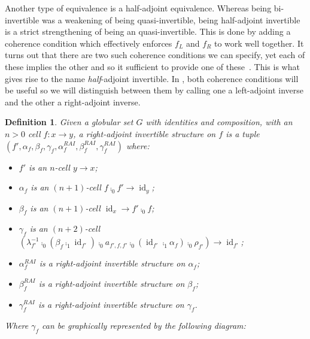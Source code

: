 \documentclass[draft]{article}
\renewcommand{\comment}[1]{\todo[color=green!40]{#1}}
\newtheorem{definition}[theorem]{Definition} \theoremstyle{remark}
\DeclareMathOperator{\id}{id}
\begin{document}
Another type of equivalence is a half-adjoint equivalence. Whereas
being bi-invertible was a weakening of being quasi-invertible, being
half-adjoint invertible is a strict strengthening of being an
quasi-invertible. This is done by adding a coherence condition which
effectively enforces \(f_L\) and \(f_R\) to work well together. It
turns out that there are two such coherence conditions we can specify,
yet each of these implies the other and so it sufficient to provide
one of these~\cite[Lemma 3.2]{nlab:adjoint_equivalence}. This
is what gives rise to the name \emph{half}-adjoint invertible. In
, both coherence conditions will be useful
so we will distinguish between them by calling one a left-adjoint
inverse and the other a right-adjoint inverse.

\begin{definition}
  Given a globular set \(G\) with identities and composition, with an
  \(n > 0\) cell \(f : x \to y\), a \emph{right-adjoint invertible}
  structure on \(f\) \comment{are these the right way round?} is a
  tuple \((f', \alpha_f, \beta_f, \gamma_f, \alpha_f^{RAI},
  \beta_f^{RAI}, \gamma_f^{RAI})\) where:
  \begin{itemize}
  \item \(f'\) is an \(n\)-cell \(y \to x\);
  \item \(\alpha_f\) is an \((n+1)\)-cell \(f \comp_0 f' \to \id_y\);
  \item \(\beta_f\) is an \((n+1)\)-cell \(\id_x \to f' \comp_0 f\);
  \item \(\gamma_f\) is an \((n+2)\)-cell \((\lambda_{f'}^{-1} \comp_0
    (\beta_f \comp_1 \id_{f'}) \comp_0 a_{f',f,f'} \comp_0 (\id_{f'}
    \comp_1 \alpha_f) \comp_0 \rho_{f'}) \to \id_{f'}\);
  \item \(\alpha_f^{RAI}\) is a right-adjoint invertible structure on
    \(\alpha_f\);
  \item \(\beta_f^{RAI}\) is a right-adjoint invertible structure on
    \(\beta_f\);
  \item \(\gamma_f^{RAI}\) is a right-adjoint invertible structure on
    \(\gamma_f\).
  \end{itemize}

  Where \(\gamma_f\) can be graphically represented by the following
  diagram:
  \begin{center}
\end{center}
\end{definition}
\end{document}
